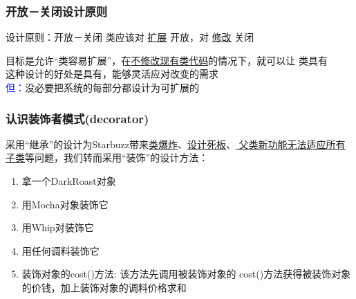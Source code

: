 \documentclass[compress]{beamer}
\begin{document}
\begin{frame}
  \frametitle{开放－关闭设计原则}
  \begin{block}{设计原则：开放－关闭}
    类应该对 \uline{扩展} 开放，对 \uline{修改} 关闭
  \end{block}

  目标是允许``类容易扩展''，在\uline{不修改现有类代码}的情况下，就可以让
  类具有 \\[2ex]

  这种设计的好处是具有，能够灵活应对改变的需求 \\[2ex]

  \textcolor{blue}{但：}没必要把系统的每部分都设计为可扩展的
\end{frame}

\begin{frame}
  \frametitle{认识装饰者模式(decorator)}
  采用``继承''的设计为Starbuzz带来\uline{类爆炸}、\uline{设计死板}、\uline{
  父类新功能无法适应所有子类}等问题，我们转而采用``装饰''的设计方法：
  \begin{enumerate}
    \item 拿一个DarkRoast对象
    \item 用Mocha对象装饰它
    \item 用Whip对装饰它
    \item 用任何调料装饰它
    \item 装饰对象的cost()方法: 该方法先调用被装饰对象的
      cost()方法获得被装饰对象的价钱，加上装饰对象的调料价格求和
  \end{enumerate}
\end{frame}
\end{document}

